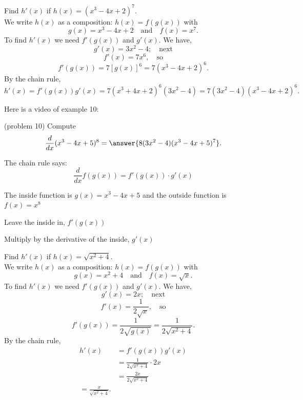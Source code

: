 \documentclass[handout]{ximera}
\begin{document}
\begin{example}[example 10]

Find $h'(x)$ if $h(x) = (x^3 - 4x + 2)^7$.\\
We write $h(x)$ as a composition: $h(x)=f(g(x))$ with 
\[
g(x) = x^3 - 4x + 2  \quad \text{and} \quad  f(x) = x^7.
\]
To find $h'(x)$ we need $f'(g(x))$ and $g'(x)$.  We have,
\[
g'(x) =3x^2 - 4; \quad \text{next} 
\]
\[
f'(x) = 7x^6 , \quad \text{so}
\]
\[
f'(g(x)) = 7[g(x)]^6 = 7(x^3 - 4x + 2)^6 .
\]
By the chain rule,
\[
h'(x) = f'(g(x))g'(x) = 7(x^3 + 4x + 2)^6(3x^2 - 4)=7(3x^2 - 4)(x^3 - 4x + 2)^6.
\]
\end{example}

Here is a video of example 10:
\begin{foldable}
\end{foldable}





\begin{problem}(problem 10)
  Compute
  \[
  \frac{d}{dx} (x^3 - 4x + 5)^8 = \answer{8(3x^2 - 4)(x^3 - 4x + 5)^7 }.
  \]
  
    \begin{hint}
      The chain rule says:
      \[
      \frac{d}{dx} f(g(x)) = f'(g(x))\cdot g'(x)
      \]
    \end{hint}
    \begin{hint}
      The inside
      function is $g(x) = x^3 - 4x + 5$ and the outside function is $f(x) = x^8$  
    \end{hint}
    \begin{hint}
		  Leave the inside in, $f'(g(x))$
		\end{hint}
		\begin{hint}
		  Multiply by the derivative of the inside, $g'(x)$
		\end{hint}
    
\end{problem}




\begin{example}[example 11]

Find $h'(x)$ if $h(x) = \sqrt{x^2 + 4}$.\\
We write $h(x)$ as a composition: $h(x)=f(g(x))$ with 
\[
g(x) = x^2 + 4  \quad \text{and} \quad  f(x) = \sqrt x.
\] 
To find $h'(x)$ we need $f'(g(x))$ and $g'(x)$.  We have,
\[
g'(x) = 2x; \quad \text{next} 
\]
\[
f'(x) = \frac{1}{2\sqrt x} , \quad \text{so}
\] 
\[
f'(g(x)) = \frac{1}{2\sqrt {g(x)}}=\frac{1}{2\sqrt {x^2 + 4}}.
\]
By the chain rule,
\begin{align*}
h'(x) &= f'(g(x))g'(x)\\
&= \frac{1}{2\sqrt {x^2 + 4}}\cdot 2x\\
&= \frac{2x}{2\sqrt {x^2 + 4}}\\
=\frac{x}{\sqrt {x^2 + 4}}.
\end{align*}
\end{example}
\end{document}
